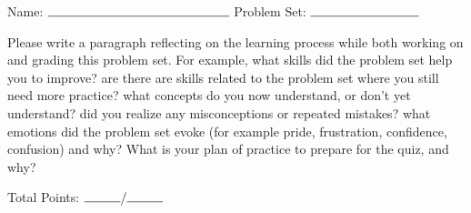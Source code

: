 \documentclass[11pt]{article}
\begin{document}

\hfill Name: $\rule{5cm}{.15mm}$\newline
{}\hfill Problem Set: $\rule{3cm}{.15mm}$




\vspace{1cm}

Please write a paragraph reflecting on the learning process while both working on and grading this problem set. For example, what skills did the problem set help you to improve? are there are skills related to the problem set where you still need more practice? what concepts do you now understand, or don't yet understand? did you realize any misconceptions or repeated mistakes? what emotions did the problem set evoke (for example pride, frustration, confidence, confusion) and why? What is your plan of practice to prepare for the quiz, and why?

\vspace{16cm}
\noindent Total Points: $\rule{1cm}{0.15mm}/\rule{1cm}{0.15mm}$
\end{document}
